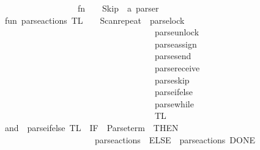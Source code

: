 \begin{isabellebody}
\ \ \ \ \ \ \ \ \ \ \ \ \ \ \ \ {\isachargreater}{\kern0pt}{\isachargreater}{\kern0pt}\ {\isacharparenleft}{\kern0pt}fn\ {\isacharunderscore}{\kern0pt}\ \ {\isacharequal}{\kern0pt}{\isachargreater}{\kern0pt}\ Skip{\isacharparenright}{\kern0pt}\ {\isacharcolon}{\kern0pt}\ a\ parser\isanewline
\isanewline
fun\ parse{\isacharunderscore}{\kern0pt}actions\ TL\ \ \ {\isacharequal}{\kern0pt}{\isacharparenleft}{\kern0pt}\ Scan{\isachardot}{\kern0pt}repeat\ {\isacharparenleft}{\kern0pt}\ parse{\isacharunderscore}{\kern0pt}lock\ \isanewline
\ \ \ \ \ \ \ \ \ \ \ \ \ \ \ \ \ \ \ \ \ \ \ \ \ \ \ \ \ \ \ \ \ \ {\isacharbar}{\kern0pt}{\isacharbar}{\kern0pt}\ parse{\isacharunderscore}{\kern0pt}unlock\ \isanewline
\ \ \ \ \ \ \ \ \ \ \ \ \ \ \ \ \ \ \ \ \ \ \ \ \ \ \ \ \ \ \ \ \ \ {\isacharbar}{\kern0pt}{\isacharbar}{\kern0pt}\ parse{\isacharunderscore}{\kern0pt}assign\isanewline
\ \ \ \ \ \ \ \ \ \ \ \ \ \ \ \ \ \ \ \ \ \ \ \ \ \ \ \ \ \ \ \ \ \ {\isacharbar}{\kern0pt}{\isacharbar}{\kern0pt}\ parse{\isacharunderscore}{\kern0pt}send\ \isanewline
\ \ \ \ \ \ \ \ \ \ \ \ \ \ \ \ \ \ \ \ \ \ \ \ \ \ \ \ \ \ \ \ \ \ {\isacharbar}{\kern0pt}{\isacharbar}{\kern0pt}\ parse{\isacharunderscore}{\kern0pt}receive\isanewline
\ \ \ \ \ \ \ \ \ \ \ \ \ \ \ \ \ \ \ \ \ \ \ \ \ \ \ \ \ \ \ \ \ \ {\isacharbar}{\kern0pt}{\isacharbar}{\kern0pt}\ parse{\isacharunderscore}{\kern0pt}skip\isanewline
\ \ \ \ \ \ \ \ \ \ \ \ \ \ \ \ \ \ \ \ \ \ \ \ \ \ \ \ \ \ \ \ \ \ {\isacharbar}{\kern0pt}{\isacharbar}{\kern0pt}\ parse{\isacharunderscore}{\kern0pt}if{\isacharunderscore}{\kern0pt}else\ \isanewline
\ \ \ \ \ \ \ \ \ \ \ \ \ \ \ \ \ \ \ \ \ \ \ \ \ \ \ \ \ \ \ \ \ \ {\isacharbar}{\kern0pt}{\isacharbar}{\kern0pt}\ parse{\isacharunderscore}{\kern0pt}while\ \isanewline
\ \ \ \ \ \ \ \ \ \ \ \ \ \ \ \ \ \ \ \ \ \ \ \ \ \ \ \ \ \ \ \ \ \ {\isacharparenright}{\kern0pt}{\isacharparenright}{\kern0pt}\ TL\isanewline
and\ \ parse{\isacharunderscore}{\kern0pt}if{\isacharunderscore}{\kern0pt}else\ TL\ {\isacharequal}{\kern0pt}\ {\isacharparenleft}{\kern0pt}{\isacharparenleft}{\kern0pt}\isactrlkeyword {\isasymopen}IF{\isasymclose}\ {\isacharbar}{\kern0pt}{\isacharminus}{\kern0pt}{\isacharminus}{\kern0pt}\ Parse{\isachardot}{\kern0pt}term\ {\isacharminus}{\kern0pt}{\isacharminus}{\kern0pt}{\isacharbar}{\kern0pt}\ \isactrlkeyword {\isasymopen}THEN{\isasymclose}\isanewline
\ \ \ \ \ \ \ \ \ \ \ \ \ \ \ \ \ \ \ \ {\isacharminus}{\kern0pt}{\isacharminus}{\kern0pt}\ parse{\isacharunderscore}{\kern0pt}actions\ {\isacharminus}{\kern0pt}{\isacharminus}{\kern0pt}{\isacharbar}{\kern0pt}\ \isactrlkeyword {\isasymopen}ELSE{\isasymclose}\ {\isacharminus}{\kern0pt}{\isacharminus}{\kern0pt}\ parse{\isacharunderscore}{\kern0pt}actions{\isacharminus}{\kern0pt}{\isacharminus}{\kern0pt}{\isacharbar}{\kern0pt}\ \isactrlkeyword {\isasymopen}DONE{\isasymclose}{\isacharparenright}{\kern0pt}\isanewline

\end{isabellebody}
